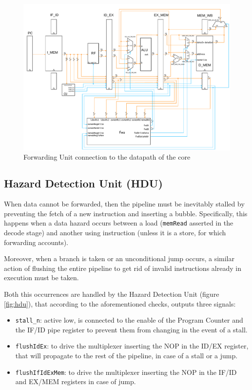 \documentclass[a4paper]{article}
\begin{document}
\begin{figure}[hbtp]
    \centering
    \includegraphics[width=\textwidth]{../fwu/ref/schematic/fwu_5stages.pdf}
    \caption{Forwarding Unit connection to the datapath of the core}
    \label{fig:fwu_5stages}
\end{figure}

\subsection{Hazard Detection Unit (HDU)}
When data cannot be forwarded, then the pipeline must be inevitably stalled by preventing the fetch of a new instruction and inserting a bubble. Specifically, this happens when a data hazard occurs between a load (\texttt{memRead} asserted in the decode stage) and another using instruction (unless it is a store, for which forwarding accounts).

Moreover, when a branch is taken or an unconditional jump occurs, a similar action of flushing the entire pipeline to get rid of invalid instructions already in execution must be taken.

Both this occurrences are handled by the Hazard Detection Unit (figure \ref{fig:hdu}), that according to the aforementioned checks, outputs three signals:
\begin{itemize}
    \item \texttt{stall\_n}: active low, is connected to the enable of the Program Counter and the IF/ID pipe register to prevent them from changing in the event of a stall.
    \item \texttt{flushIdEx}: to drive the multiplexer inserting the NOP in the ID/EX register, that will propagate to the rest of the pipeline, in case of a stall or a jump.
    \item \texttt{flushIfIdExMem}: to drive the multiplexer inserting the NOP in the IF/ID and EX/MEM registers in case of jump.
\end{itemize}
\end{document}
